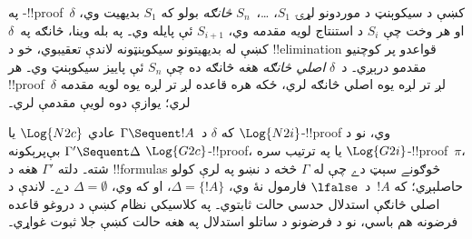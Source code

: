 \documentclass[../../../include/open-logic-section]{subfiles}
\begin{document}
په -!!{proof}~$\delta$ کښې د سيکوېنټ د
موردونو لړۍ $S_1$، \dots،~$S_n$ \emph{څانګه} بولو که
$S_1$ بديهيت وي، او هر وخت چې $S_i$ د استنتاج لويه مقدمه
وي، $S_{i+1}$ ئې پايله وي۔ په بله وينا، څانګه په~$\delta$
کښې له بديهيتونو سيکوېنټونه لاندې تعقيبوي، خو د
!!{elimination} قواعدو پر کوچنيو مقدمو درېږي۔ د~$\delta$
\emph{اصلي څانګه} هغه څانګه ده چې $S_n$ ئې پاييز سيکوېنټ
وي۔ هر !!{proof}~$\delta$ لږ تر لږه يوه اصلي څانګه لري،
ځکه هره قاعده لږ تر لږه يوه لويه مقدمه لري؛ يوازې
\Intro{\land} دوه لويې مقدمې لري۔

\begin{prop}
که $\delta$ د~$\Gamma \Sequent !A$ عادي $\Log{N2c}$ يا
$\Log{N2i}$-!!{proof} وي، نو د $\Gamma' \Sequent \Delta$
بې‌پرېکونه $\Log{G2c}$-!!{proof}، يا په ترتيب سره
$\Log{G2i}$-!!{proof}~$\pi$، شته۔ دلته $\Gamma'$ هغه
د !!{formula}s څوګونے سېټ دے چې له $\Gamma$ څخه د نښو په
لرې کولو حاصلېږي؛ که $!A$~د~$\lfalse$ فارمول نۀ وي،
$\Delta = \{!A\}$، او که وي، $\Delta = \emptyset$ دے۔
لاندې د اصلي څانګې استدلال حدسي حالت ثابتوي۔ په کلاسيکي
نظام کښې د دروغو قاعده فرضونه هم باسي، نو د فرضونو د
ساتلو استدلال په هغه حالت کښې جلا ثبوت غواړي۔
\end{prop}
\end{document}
